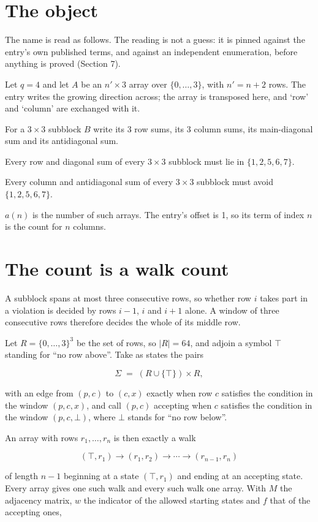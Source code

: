 \documentclass[11pt]{article}
\theoremstyle{definition}
\begin{document}
\section{The object}

The name is read as follows. The reading is not a guess: it is pinned against the entry's own published terms, and against an independent enumeration, before anything is proved (Section 7).

Let $q = 4$ and let $A$ be an $n' \times 3$ array over $\{0,\dots,3\}$, with $n' = n + 2$ rows. The entry writes the growing direction across; the array is transposed here, and `row' and `column' are exchanged with it.

For a $3\times3$ subblock $B$ write its 3 row sums, its 3 column sums, its main-diagonal sum and its antidiagonal sum.

Every row and diagonal sum of every $3\times3$ subblock must lie in $\{1, 2, 5, 6, 7\}$.

Every column and antidiagonal sum of every $3\times3$ subblock must avoid $\{1, 2, 5, 6, 7\}$.

$a(n)$ is the number of such arrays. The entry's offset is 1, so its term of index $n$ is the count for $n$ columns.

\section{The count is a walk count}

A subblock spans at most three consecutive rows, so whether row $i$ takes part in a violation is decided by rows $i-1$, $i$ and $i+1$ alone. A window of three consecutive rows therefore decides the whole of its middle row.

Let $R = \{0,\dots,3\}^{3}$ be the set of rows, so $|R| = 64$, and adjoin a symbol $\top$ standing for ``no row above''. Take as states the pairs

\[\Sigma \;=\; (R \cup \{\top\}) \times R,\]

with an edge from $(p,c)$ to $(c,x)$ exactly when row $c$ satisfies the condition in the window $(p,c,x)$, and call $(p,c)$ accepting when $c$ satisfies the condition in the window $(p,c,\bot)$, where $\bot$ stands for ``no row below''.

An array with rows $r_1,\dots,r_n$ is then exactly a walk

\[(\top,r_1) \to (r_1,r_2) \to \cdots \to (r_{n-1},r_n)\]

of length $n-1$ beginning at a state $(\top,r_1)$ and ending at an accepting state. Every array gives one such walk and every such walk one array. With $M$ the adjacency matrix, $w$ the indicator of the allowed starting states and $f$ that of the accepting ones,
\end{document}
